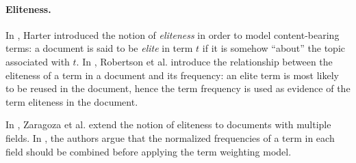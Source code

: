 %  		
%  		
%	  	

\paragraph{Eliteness.}

In \cite{harter:1974:thesis}, Harter introduced the notion of \emph{eliteness} in order to model content-bearing terms: a document is said to be \emph{elite} in term $t$ if it is somehow ``about'' the topic associated with $t$. In \cite{robertson:1981:PMI}, Robertson et al. introduce the relationship between the eliteness of a term in a document and its frequency: an elite term is most likely to be reused in the document, hence the term frequency is used as evidence of the term eliteness in the document.

In \cite{zaragoza:2004:microsoft}, Zaragoza et al. extend the notion of eliteness to documents with multiple fields. In \cite{robertson:2004:cikm}, the authors argue that the normalized frequencies of a term in each field should be combined before applying the term weighting model.

